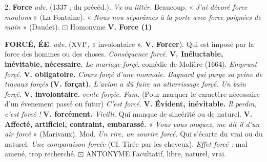 2. {\bf Force} {\it adv.} (1337 ; du précéd.). {\it Vx} ou {\it littér.} Beaucoup. « {\it J'ai dévoré force moutons} » ({\sc La Fontaine}). « {\it Nous nou séparâmes à la porte avec force poignées de main} » ({\sc Daudet}). $\boxdot$ {\sc Homonyme} {\bf V. Force (1)}

\vspace{0.24cm}
{\footnotesize {\bf FORCÉ, ÉE}. {\it adv.} ({\footnotesize XVI}$^\text{e}$, « involontaire ». {\bf V. Forcer}).  Qui est imposé par la force des hommes ou des choses. {\it Conséquence forcé}. {\bf V. Inéluctable, inévitable, nécessaire.} {\it Le mariage forçé}, comédie de Molière (1664). {\it Emprunt forçé}. {\bf V. obligatoire.} {\it Cours forçé d'une monnaie. Bagnard qui purge sa peine de travaux forçés} {\bf (V. forçat).} {\it L'avion a dû faire un atterrissage forçé. Un bain forçé.} {\bf V. involontaire.} {\it vente forçée. \lb Fam.} (Pour marquer le caractère nécessaire d'un évenement passé ou futur) {\it C'est forcé.} {\bf V. Évident, inévitable.} {\it Il perdra, c'est forcé !} {\bf V. forcément.}  {\it Vieilli.} Qui manque de sincérité ou de naturel. {\bf V. Affecté, artificiel, contraint, embarassé.} « {\it Vous vous moquez, me dit-il d'un air forcé} » ({\sc Marivaux}). Mod. {\it Un rire, un sourire forcé.}  Qui s'écarte du vrai ou du naturel. {\it Une comparaison forcée} (Cf. Tirée par les cheveux). {\it Effet forcé :} mal amené, trop recherché. $\boxdot$ {\sc ANTONYME} \si{Facultatif, libre, naturel, vrai.}}
\vspace{0.31cm}

